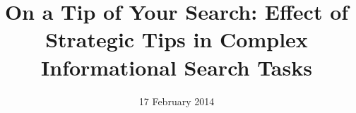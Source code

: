 \documentclass{sig-alternate}
\begin{document}
%

\title{On a Tip of Your Search: Effect of Strategic Tips in Complex Informational Search Tasks}

%
%
%
%
%


\date{17 February 2014}
\end{document}
